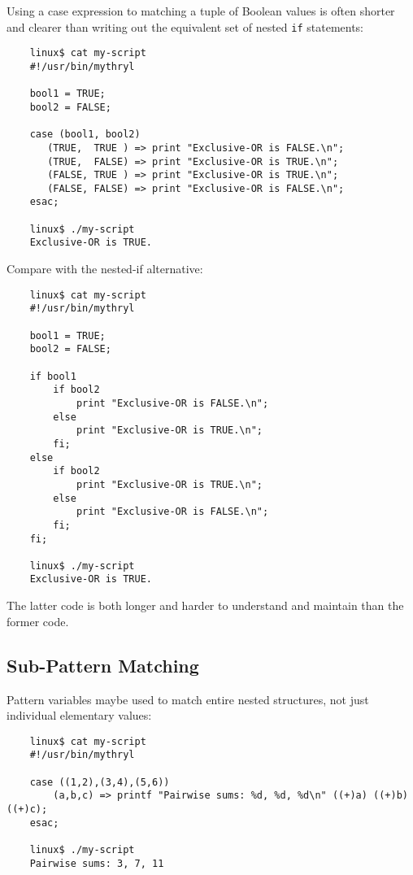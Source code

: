 Using a case expression to matching a tuple of Boolean values is often shorter and 
clearer than writing out the equivalent set of nested {\tt if} statements:

\begin{verbatim}
    linux$ cat my-script
    #!/usr/bin/mythryl

    bool1 = TRUE;
    bool2 = FALSE;

    case (bool1, bool2)
       (TRUE,  TRUE ) => print "Exclusive-OR is FALSE.\n";
       (TRUE,  FALSE) => print "Exclusive-OR is TRUE.\n";
       (FALSE, TRUE ) => print "Exclusive-OR is TRUE.\n";
       (FALSE, FALSE) => print "Exclusive-OR is FALSE.\n";
    esac;

    linux$ ./my-script
    Exclusive-OR is TRUE.
\end{verbatim}

Compare with the nested-if alternative:

\begin{verbatim}
    linux$ cat my-script
    #!/usr/bin/mythryl

    bool1 = TRUE;
    bool2 = FALSE;

    if bool1
        if bool2
            print "Exclusive-OR is FALSE.\n";
        else
            print "Exclusive-OR is TRUE.\n";
        fi;
    else
        if bool2
            print "Exclusive-OR is TRUE.\n";
        else
            print "Exclusive-OR is FALSE.\n";
        fi;
    fi;

    linux$ ./my-script
    Exclusive-OR is TRUE.
\end{verbatim}

The latter code is both longer and harder to understand and maintain 
than the former code.



\cutend*


\subsection{Sub-Pattern Matching}
\label{section:ref:case-expressions-and-pattern-matching:subpatterns}

Pattern variables maybe used to match entire nested structures,
not just individual elementary values:

\begin{verbatim}
    linux$ cat my-script
    #!/usr/bin/mythryl

    case ((1,2),(3,4),(5,6))
        (a,b,c) => printf "Pairwise sums: %d, %d, %d\n" ((+)a) ((+)b) ((+)c);
    esac;

    linux$ ./my-script
    Pairwise sums: 3, 7, 11
\end{verbatim}

